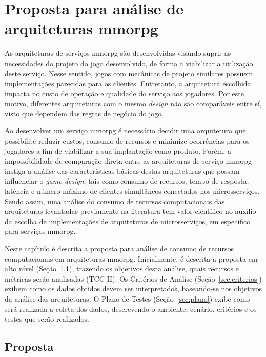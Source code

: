 \chapter{Proposta para análise de arquiteturas \ac{mmorpg}}
\label{cap3}



As arquiteturas de serviços \ac{mmorpg} são desenvolvidas visando suprir as necessidades do projeto do jogo desenvolvido, de forma a viabilizar a utilização deste serviço.
%
Nesse sentido, jogos com mecânicas de projeto similares possuem implementações parecidas para os clientes.
%
Entretanto, a arquitetura escolhida impacta no custo de operação e qualidade do serviço aos jogadores.
%
Por este motivo, diferentes arquiteturas com o mesmo \textit{design} não são comparáveis entre sí, visto que dependem das regras de negócio do jogo.



Ao desenvolver um serviço \ac{mmorpg} é necessário decidir uma arquitetura que possibilite reduzir custos, consumo de recursos e minimize ocorrências para os jogadores a fim de viabilizar a sua implantação como produto.
%
Porém, a impossibilidade de comparação direta entre as arquiteturas de serviço \ac{mmorpg} instiga a análise das características básicas destas arquiteturas que possam influenciar o \textit{game design}, tais como consumo de recursos, tempo de resposta, latência e número máximo de clientes simultâneos conectados nos microsserviços.
%
Sendo assim, uma análise do consumo de recursos computacionais das arquiteturas levantadas previamente na literatura tem valor científico no auxílio da escolha de implementações de arquiteturas de microsserviços, em específico para serviços \ac{mmorpg}.



Neste capítulo é descrita a proposta para análise de consumo de recursos computacionais em arquiteturas \ac{mmorpg}.
%
Inicialmente, é descrita a proposta em alto nível (Seção~\ref{sec:proposta}), trazendo os objetivos desta análise, quais recursos e métricas serão analisadas (TCC-II).
%
Os Critérios de Análise (Seção~\ref{sec:criterios}) exibem como os dados obtidos devem ser interpretados, baseando-se nos objetivos da análise das arquiteturas.
%
O Plano de Testes (Seção~\ref{sec:plano}) exibe como será realizada a coleta dos dados, descrevendo o ambiente, cenário, critérios e os testes que serão realizados. %
%

\section{Proposta}
\label{sec:proposta}

